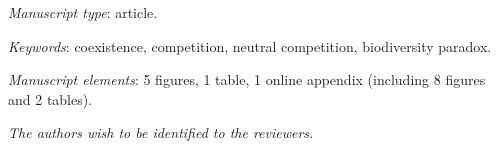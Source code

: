 \documentclass[a4paper, onecolumn, 10pt]{article}
\begin{document}
\maketitle

\bigskip
\textit{Manuscript type}: article.

\bigskip
\textit{Keywords}: coexistence, competition, neutral competition, biodiversity paradox.

\bigskip
\textit{Manuscript elements}: 5 figures, 1 table, 1 online appendix (including 8 figures and 2 tables).

\bigskip
\textit{The authors wish to be identified to the reviewers.}

\newpage


\newpage






\clearpage


\clearpage


\end{document}
